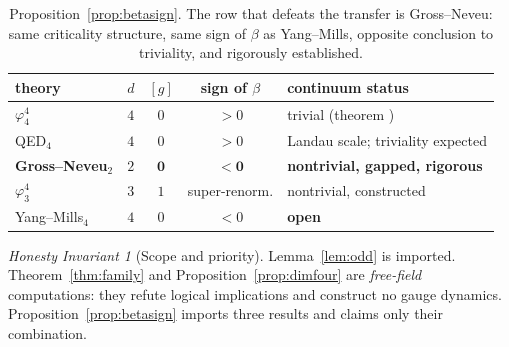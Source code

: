 \documentclass[11pt,a4paper]{article}
\theoremstyle{plain}
\theoremstyle{definition}
\theoremstyle{remark}
\newtheorem{invariant}[theorem]{Honesty Invariant}
\renewcommand{\_}{\oldunderscore\allowbreak}
\begin{document}
\begin{table}[htbp]\centering\small
\renewcommand{\arraystretch}{1.2}
\begin{tabular}{lcccl}
\toprule
theory & $d$ & $[g]$ & sign of $\beta$ & continuum status\\
\midrule
$\varphi^4_4$ & $4$ & $0$ & $>0$ & trivial (theorem \cite{ADC2021})\\
QED$_4$ & $4$ & $0$ & $>0$ & Landau scale; triviality expected\\
\textbf{Gross--Neveu$_2$} & $2$ & $\mathbf0$ & $\mathbf{<0}$ &
\textbf{nontrivial, gapped, rigorous} \cite{FMRS1986}\\
$\varphi^4_3$ & $3$ & $1$ & super-renorm. & nontrivial, constructed \cite{FeldmanOsterwalder1976}\\
Yang--Mills$_4$ & $4$ & $0$ & $<0$ & \textbf{open}\\
\bottomrule
\end{tabular}
\caption{Proposition~\ref{prop:betasign}. The row that defeats the transfer is Gross--Neveu:
same criticality structure, same sign of $\beta$ as Yang--Mills, opposite conclusion to
triviality, and rigorously established.}
\label{tab:betasign}
\end{table}
\begin{invariant}[Scope and priority]\label{inv:gaugeinv-scope}
Lemma~\ref{lem:odd} is imported. Theorem~\ref{thm:family} and Proposition~\ref{prop:dimfour} are
\emph{free-field} computations: they refute logical implications and construct no gauge dynamics.
Proposition~\ref{prop:betasign} imports three results and claims only their combination.
\end{invariant}
\end{document}
